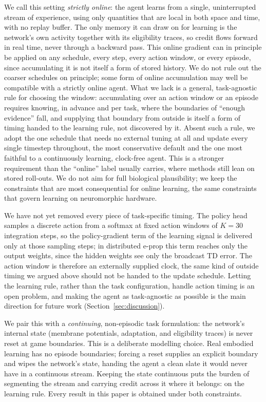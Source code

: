 \documentclass[10pt,twocolumn]{article}
\begin{document}
We call this setting \emph{strictly online}: the agent learns from a single,
uninterrupted stream of experience, using only quantities that are local in
both space and time, with no replay buffer. The only memory it can draw on for
learning is the network's own activity together with its eligibility traces,
so credit flows forward in real time, never through a backward pass. This
online gradient can in principle be applied on any schedule, every step, every
action window, or every episode, since accumulating it is not itself a form of
stored history. We do not rule out the coarser schedules on principle; some
form of online accumulation may well be compatible with a strictly online
agent. What we lack is a general, task-agnostic rule for choosing the window:
accumulating over an action window or an episode requires knowing, in advance
and per task, where the boundaries of ``enough evidence'' fall, and supplying
that boundary from outside is itself a form of timing handed to the learning
rule, not discovered by it. Absent such a rule, we adopt the one
schedule that needs no external tuning at all and update every single
timestep throughout, the most conservative default and the one most faithful
to a continuously learning, clock-free agent. This is a stronger requirement
than the ``online'' label usually carries, where methods still lean on stored
roll-outs. We do not aim for full biological plausibility; we keep the
constraints that are most consequential for online learning, the same
constraints that govern learning on neuromorphic hardware.

We have not yet removed every piece of task-specific timing. The policy head
samples a discrete action from a softmax at fixed action windows of $K=30$
integration steps, so the policy-gradient term of the learning signal is
delivered only at those sampling steps; in distributed e-prop this term
reaches only the output weights, since the hidden weights see only the
broadcast TD error. The action window is therefore an externally supplied
clock, the same kind of outside timing we argued above should not be handed
to the update schedule. Letting the learning rule, rather than the task
configuration, handle action timing is an open problem, and making the agent
as task-agnostic as possible is the main direction for future work
(Section~\ref{sec:discussion}).

We pair this with a \emph{continuing}, non-episodic task formulation: the
network's internal state (membrane potentials, adaptation, and eligibility
traces) is never reset at game boundaries. This is a deliberate modelling
choice. Real embodied learning has no episode boundaries; forcing a reset
supplies an explicit boundary and wipes the network's state, handing the agent
a clean slate it would never have in a continuous stream. Keeping the state
continuous puts the burden of segmenting the stream and carrying credit across
it where it belongs: on the learning rule. Every result in this paper is
obtained under both constraints.
\end{document}
